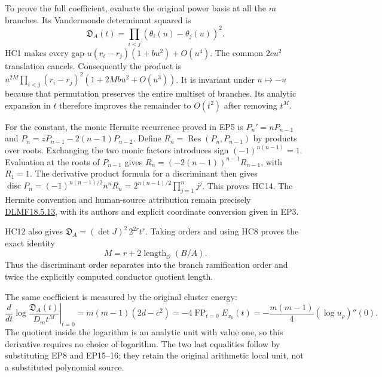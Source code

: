\documentclass[11pt,a4paper]{article}
\theoremstyle{definition}\newtheorem{definition}[theorem]{Definition}
\begin{document}
To prove the full coefficient, evaluate the original power basis at
all the $m$ branches. Its Vandermonde determinant squared is
\[
 \mathfrak D_A(t)=\prod_{i<j}
                    (\theta_i(u)-\theta_j(u))^2.
 \tag{HC15}
\]
HC1 makes every gap $u(r_i-r_j)(1+bu^2)+O(u^4)$.
The common $2cu^2$ translation cancels. Consequently the product
is $u^{2M}\prod_{i<j}(r_i-r_j)^2(1+2Mb u^2+O(u^3))$.
It is invariant under $u\mapsto-u$ because that permutation
preserves the entire multiset of branches. Its analytic expansion
in $t$ therefore improves the remainder to $O(t^2)$ after removing
$t^M$.

For the constant, the monic Hermite recurrence proved in EP5 is
$P_n'=nP_{n-1}$ and $P_n=zP_{n-1}-2(n-1)P_{n-2}$.
Define $R_n=\operatorname{Res}(P_n,P_{n-1})$ by products over roots.
Exchanging the two monic factors introduces sign
$(-1)^{n(n-1)}=1$. Evaluation at the roots of $P_{n-1}$ gives
$R_n=(-2(n-1))^{n-1}R_{n-1}$, with $R_1=1$.
The derivative product formula for a discriminant then gives
$\operatorname{disc}P_n=(-1)^{n(n-1)/2}n^nR_n
=2^{n(n-1)/2}\prod_{j=1}^n j^j$. This proves HC14.
The Hermite convention and human-source attribution remain precisely
\href{https://dlmf.nist.gov/18.5.E13}{DLMF18.5.13}, with its authors
and explicit coordinate conversion given in EP3.

HC12 also gives
$\mathfrak D_A=(\det J)^2\,2^{2r}t^r$.
Taking orders and using HC8 proves the exact identity
\[
 M=r+2\operatorname{length}_{\mathcal O}(B/A).
 \tag{HC16}
\]
Thus the discriminant order separates into the branch ramification
order and twice the explicitly computed conductor quotient length.

The same coefficient is measured by the original cluster energy:
\[
 \left.\frac{d}{dt}\log
       \frac{\mathfrak D_A(t)}{D_m t^M}\right|_{t=0}
   =m(m-1)(2d-c^2)
   =-4\operatorname{FP}_{t=0}E_{x_0}(t)
   =-\frac{m(m-1)}4(\log u_\rho)''(0).
 \tag{HC17}
\]
The quotient inside the logarithm is an analytic unit with value
one, so this derivative requires no choice of logarithm.
The two last equalities follow by substituting EP8 and EP15--16;
they retain the original arithmetic local unit, not a substituted
polynomial source.
\end{document}
